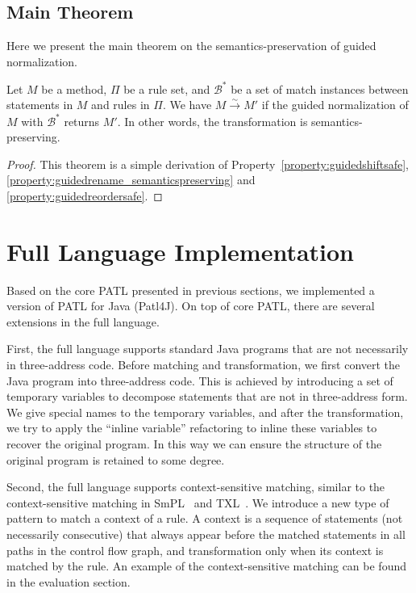 \documentclass[a4paper, USenglish]{lipics-v2016}
\newcommand{\PATL}{PATL\xspace}
\theoremstyle{plain}
\begin{document}
\subsection{Main Theorem}

Here we present the main theorem on the semantics-preservation of guided normalization.

\begin{theorem} Let $M$ be a method, $\Pi$ be a rule
  set, and $\mathcal{B}^*$ be a set of match instances between
  statements in $M$ and rules in $\Pi$. We have $M\xrightarrow{\sim}
  M'$ if the guided normalization of $M$ with $\mathcal{B}^*$ returns
  $M'$. In other words, the transformation is semantics-preserving.
\end{theorem}
\begin{proof} This theorem is a simple derivation of
  Property~\ref{property:guidedshiftsafe}, \ref{property:guidedrename_semanticspreserving} and \ref{property:guidedreordersafe}.
\end{proof}



\section{Full Language Implementation}\label{sec:implementation}
Based on the core \PATL presented in previous sections, we implemented
a version of \PATL for Java (Patl4J). On top of core \PATL, there
are several extensions in the full language.

First, the full language supports standard Java programs that are not
necessarily in three-address code. Before matching and transformation,
we first convert the Java program into three-address code. This is
achieved by introducing a set of temporary variables to decompose
statements that are not in three-address form. We give special names
to the temporary variables, and after the transformation, we try to
apply the ``inline variable'' refactoring to inline these variables to
recover the original program. In this way we can ensure the structure
of the original program is retained to some degree.

Second, the full language supports context-sensitive matching, similar
to the context-sensitive matching in
SmPL~\cite{DBLP:conf/eurosys/PadioleauLHM08} and TXL~\cite{Cordy:2006:TST:1149670.1149672}. We
introduce a new type of pattern to match a context of a rule. A
context is a sequence of statements (not necessarily consecutive) that
always appear before the matched statements in all paths in the
control flow graph, and transformation only when its
context is matched by the rule. An example of the context-sensitive matching can be found in the
evaluation section.
\end{document}
